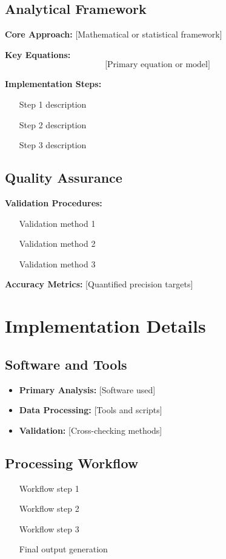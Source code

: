\documentclass[11pt,letterpaper]{article}
\begin{document}
\subsection{Analytical Framework}

\textbf{Core Approach:} [Mathematical or statistical framework]

\textbf{Key Equations:}
\begin{equation}
    \text{[Primary equation or model]}
\end{equation}

\textbf{Implementation Steps:}
\begin{enumerate}
    \item [Step 1 description]
    \item [Step 2 description]
    \item [Step 3 description]
\end{enumerate}

\subsection{Quality Assurance}

\textbf{Validation Procedures:}
\begin{itemize}
    \item [Validation method 1]
    \item [Validation method 2]
    \item [Validation method 3]
\end{itemize}

\textbf{Accuracy Metrics:} [Quantified precision targets]

\section{Implementation Details}

\subsection{Software and Tools}
\begin{itemize}
    \item \textbf{Primary Analysis:} [Software used]
    \item \textbf{Data Processing:} [Tools and scripts]
    \item \textbf{Validation:} [Cross-checking methods]
\end{itemize}

\subsection{Processing Workflow}
\begin{enumerate}
    \item [Workflow step 1]
    \item [Workflow step 2]
    \item [Workflow step 3]
    \item [Final output generation]
\end{enumerate}
\end{document}

